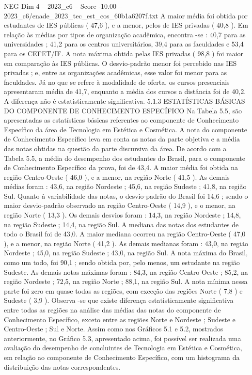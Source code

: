 \begin{textsample}{NEG Dim 4 – 2023\_c6 – Score -10.00 – 2023\_c6/enade\_2023\_tec\_est\_cos\_60b1a6207f.txt}
A maior média foi obtida por estudantes de IES públicas ( 47,6 ), e a menor, pelos de IES privadas ( 40,8 ).
Em relação às médias por tipos de organização acadêmica, encontra -se : 40,7 para as universidades ; 41,2 para os centros universitários, 39,4 para as faculdades e 53,4 para os CEFET/IF.
A nota máxima obtida pelas IES privadas ( 98,8 ) foi maior em comparação às IES públicas.
O desvio-padrão menor foi percebido nas IES privadas ; e, entre as organizações acadêmicas, esse valor foi menor para as faculdades.
Já no que se refere à modalidade de oferta, os cursos presenciais apresentaram média de 41,7, enquanto a média dos cursos a distância foi de 40,2.
A diferença não é estatisticamente significativa. 5.1.3 ESTATÍSTICAS BÁSICAS DO COMPONENTE DE CONHECIMENTO ESPECÍFICO Na Tabela 5.5, são apresentadas as estatísticas básicas referentes ao componente de Conhecimento Específico da área de Tecnologia em Estética e Cosmética.
A nota do componente de Conhecimento Específico leva em conta as notas da parte objetiva e a média das notas obtidas na questão da parte discursiva da área.
De acordo com a Tabela 5.5, a média do desempenho dos estudantes do Brasil, para o componente de Conhecimento Específico da prova, foi de 43,4.
A maior média foi obtida na região Centro-Oeste ( 46,0 ), e a menor, na região Norte ( 41,5 ).
As demais médias foram : 43,6, na região Nordeste ; 45,6, na região Sudeste ; 41,8, na região Sul.
Quanto à variabilidade das notas, o desvio-padrão do Brasil foi 14,6 ; sendo o maior desvio-padrão observado na região Centro-Oeste ( 14,9 ), e o menor, na região Norte ( 13,3 ).
Os demais desvios foram : 14,3, na região Nordeste ; 14,8, na região Sudeste ; 14,4, na região Sul.
A mediana das notas dos estudantes de todo o Brasil foi de 43,0.
A maior mediana ocorreu na região Centro-Oeste ( 47,0 ), e a menor, na região Norte ( 41,2 ).
As demais medianas foram : 43,0, na região Nordeste ; 45,0, na região Sudeste ; 43,0, na região Sul.
A nota máxima do Brasil, como um todo, foi 90,1 ; sendo obtida por, pelo menos, um estudante na região Sudeste.
As demais notas máximas foram : 84,3, na região Centro-Oeste ; 85,2, na região Nordeste ; 72,5, na região Norte ; 88,1, na região Sul.
A nota mínima nessa parte foi zero em quase todas as regiões, com exceção das regiões Norte ( 7,8 ) e Sudeste ( 3,9 ).
Observa -se que existe diferença estatisticamente significativa entre todas as regiões na análise das médias das notas do componente de Conhecimento Específico, exceto entre as regiões Norte e Nordeste ; Sudeste e Centro-Oeste ; Sul e Norte.
Assim como nos Gráficos 5.1 e 5.2, mostrados anteriormente, no Gráfico 5.3, apresentado acima, foi possível ser realizada uma avaliação do desempenho de concluintes de Tecnologia em Estética e Cosmética, em relação ao componente de Conhecimento Específico, com um histograma da distribuição das notas correspondentes.

\end{textsample}
